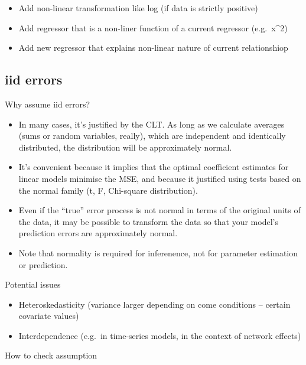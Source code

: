 \documentclass[
  letterpaper,
  DIV=11,
  numbers=noendperiod]{scrreprt}
\begin{document}
\begin{itemize}
\item
  Add non-linear transformation like log (if data is strictly positive)
\item
  Add regressor that is a non-liner function of a current regressor
  (e.g.~x\^{}2)
\item
  Add new regressor that explains non-linear nature of current
  relationshiop
\end{itemize}

\hypertarget{iid-errors}{%
\subsection{iid errors}\label{iid-errors}}

Why assume iid errors?

\begin{itemize}
\item
  In many cases, it's justified by the CLT. As long as we calculate
  averages (sums or random variables, really), which are independent and
  identically distributed, the distribution will be approximately
  normal.
\item
  It's convenient because it implies that the optimal coefficient
  estimates for linear models minimise the MSE, and because it justified
  using tests based on the normal family (t, F, Chi-square
  distribution).
\item
  Even if the ``true'' error process is not normal in terms of the
  original units of the data, it may be possible to transform the data
  so that your model's prediction errors are approximately normal.
\item
  Note that normality is required for inferenence, not for parameter
  estimation or prediction.
\end{itemize}

Potential issues

\begin{itemize}
\item
  Heteroskedasticity (variance larger depending on come conditions --
  certain covariate values)
\item
  Interdependence (e.g.~in time-series models, in the context of network
  effects)
\end{itemize}

How to check assumption
\end{document}
